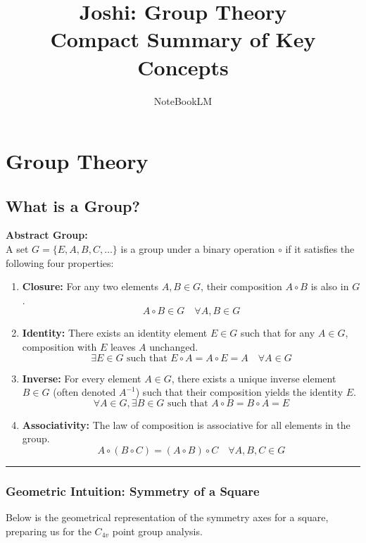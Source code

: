 \documentclass[11pt, a4paper]{report}
\title{\textbf{Joshi: Group Theory}\\ \Large Compact Summary of Key Concepts}
\author{NoteBookLM}
\begin{document}
\maketitle
\tableofcontents
\newpage
\chapter{Group Theory}
\section{What is a Group?}

\textbf{Abstract Group:}\\
A set $G = \{E, A, B, C, \dots\}$ is a group under a binary operation $\circ$ if it satisfies the following four properties:
\begin{enumerate}
    \item \textbf{Closure:} For any two elements $A, B \in G$, their composition $A \circ B$ is also in $G$.
    \[ A \circ B \in G \quad \forall A, B \in G \]
    \item \textbf{Identity:} There exists an identity element $E \in G$ such that for any $A \in G$, composition with $E$ leaves $A$ unchanged.
    \[ \exists E \in G \text{ such that } E \circ A = A \circ E = A \quad \forall A \in G \]
    \item \textbf{Inverse:} For every element $A \in G$, there exists a unique inverse element $B \in G$ (often denoted $A^{-1}$) such that their composition yields the identity $E$.
    \[ \forall A \in G, \exists B \in G \text{ such that } A \circ B = B \circ A = E \]
    \item \textbf{Associativity:} The law of composition is associative for all elements in the group.
    \[ A \circ (B \circ C) = (A \circ B) \circ C \quad \forall A, B, C \in G \]
\end{enumerate}

\vspace{1em}
\hrule
\vspace{1em}

\subsection*{Geometric Intuition: Symmetry of a Square}
Below is the geometrical representation of the symmetry axes for a square, preparing us for the $C_{4v}$ point group analysis.
\end{document}
